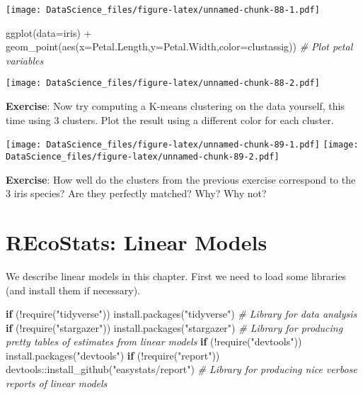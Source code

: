 \documentclass[
]{book}
\newenvironment{Shaded}{\begin{snugshade}}{\end{snugshade}}
\newcommand{\AttributeTok}[1]{\textcolor[rgb]{0.77,0.63,0.00}{#1}}
\newcommand{\CommentTok}[1]{\textcolor[rgb]{0.56,0.35,0.01}{\textit{#1}}}
\newcommand{\ControlFlowTok}[1]{\textcolor[rgb]{0.13,0.29,0.53}{\textbf{#1}}}
\newcommand{\FunctionTok}[1]{\textcolor[rgb]{0.00,0.00,0.00}{#1}}
\newcommand{\NormalTok}[1]{#1}
\newcommand{\SpecialCharTok}[1]{\textcolor[rgb]{0.00,0.00,0.00}{#1}}
\newcommand{\StringTok}[1]{\textcolor[rgb]{0.31,0.60,0.02}{#1}}
\begin{document}
\texttt{[image: DataScience\_files/figure-latex/unnamed-chunk-88-1.pdf]}

\begin{Shaded}
\begin{Highlighting}[]
\FunctionTok{ggplot}\NormalTok{(}\AttributeTok{data=}\NormalTok{iris) }\SpecialCharTok{+} \FunctionTok{geom\_point}\NormalTok{(}\FunctionTok{aes}\NormalTok{(}\AttributeTok{x=}\NormalTok{Petal.Length,}\AttributeTok{y=}\NormalTok{Petal.Width,}\AttributeTok{color=}\NormalTok{clustassig)) }\CommentTok{\# Plot petal variables}
\end{Highlighting}
\end{Shaded}

\texttt{[image: DataScience\_files/figure-latex/unnamed-chunk-88-2.pdf]}

\textbf{Exercise}: Now try computing a K-means clustering on the data yourself, this time using 3 clusters. Plot the result using a different color for each cluster.

\texttt{[image: DataScience\_files/figure-latex/unnamed-chunk-89-1.pdf]} \texttt{[image: DataScience\_files/figure-latex/unnamed-chunk-89-2.pdf]}

\textbf{Exercise}: How well do the clusters from the previous exercise correspond to the 3 iris species? Are they perfectly matched? Why? Why not?

\hypertarget{recostats-linear-models}{%
\chapter{REcoStats: Linear Models}\label{recostats-linear-models}}

We describe linear models in this chapter. First we need to load some libraries (and install them if necessary).

\begin{Shaded}
\begin{Highlighting}[]
\ControlFlowTok{if}\NormalTok{ (}\SpecialCharTok{!}\FunctionTok{require}\NormalTok{(}\StringTok{"tidyverse"}\NormalTok{)) }\FunctionTok{install.packages}\NormalTok{(}\StringTok{"tidyverse"}\NormalTok{) }\CommentTok{\# Library for data analysis}
\ControlFlowTok{if}\NormalTok{ (}\SpecialCharTok{!}\FunctionTok{require}\NormalTok{(}\StringTok{"stargazer"}\NormalTok{)) }\FunctionTok{install.packages}\NormalTok{(}\StringTok{"stargazer"}\NormalTok{) }\CommentTok{\# Library for producing pretty tables of estimates from linear models}
\ControlFlowTok{if}\NormalTok{ (}\SpecialCharTok{!}\FunctionTok{require}\NormalTok{(}\StringTok{"devtools"}\NormalTok{)) }\FunctionTok{install.packages}\NormalTok{(}\StringTok{"devtools"}\NormalTok{)}
\ControlFlowTok{if}\NormalTok{ (}\SpecialCharTok{!}\FunctionTok{require}\NormalTok{(}\StringTok{"report"}\NormalTok{)) devtools}\SpecialCharTok{::}\FunctionTok{install\_github}\NormalTok{(}\StringTok{"easystats/report"}\NormalTok{) }\CommentTok{\# Library for producing nice verbose reports of linear models}
\end{Highlighting}
\end{Shaded}
\end{document}
